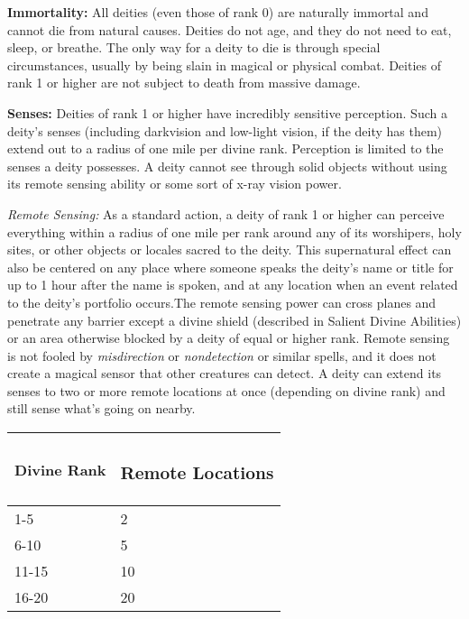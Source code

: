 \documentclass{article}
\begin{document}
\vspace{12pt}
\textbf{Immortality:} All deities (even those of rank 0) are naturally immortal 
and cannot die from natural causes. Deities do not age, and they do not need to 
eat, sleep, or breathe. The only way for a deity to die is through special circumstances, 
usually by being slain in magical or physical combat. Deities of rank 1 or higher 
are not subject to death from massive damage.

\vspace{12pt}
\textbf{Senses: }Deities of rank 1 or higher have incredibly sensitive perception. 
Such a deity's senses (including darkvision and low-light vision, if the deity 
has them) extend out to a radius of one mile per divine rank. Perception is limited 
to the senses a deity possesses. A deity cannot see through solid objects without 
using its remote sensing ability or some sort of x-ray vision power.

\textit{Remote Sensing: }As a standard action, a deity of rank 1 or higher can 
perceive everything within a radius of one mile per rank around any of its worshipers, 
holy sites, or other objects or locales sacred to the deity. This supernatural 
effect can also be centered on any place where someone speaks the deity's name 
or title for up to 1 hour after the name is spoken, and at any location when an 
event related to the deity's portfolio occurs.The remote sensing power can cross 
planes and penetrate any barrier except a divine shield (described in Salient Divine 
Abilities) or an area otherwise blocked by a deity of equal or higher rank. Remote 
sensing is not fooled by \textit{misdirection }or \textit{nondetection }or similar 
spells, and it does not create a magical sensor that other creatures can detect. 
A deity can extend its senses to two or more remote locations at once (depending 
on divine rank) and still sense what's going on nearby.

\vspace{12pt}
\begin{tabular}{|>{\raggedright}p{52pt}|>{\raggedright}p{75pt}|}
\hline
D\textbf{ivine Rank} & \subsubsection*{R\textbf{emote Locations}}\tabularnewline
\hline
1-5 & 2\tabularnewline
\hline
6-10 & 5\tabularnewline
\hline
11-15 & 10\tabularnewline
\hline
16-20 & 20\tabularnewline
\hline
\end{tabular}
\end{document}
